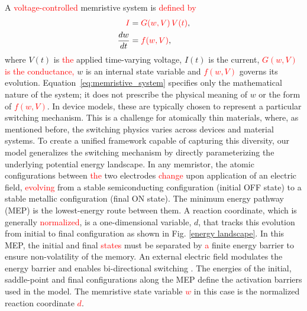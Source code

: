 \documentclass[aip,apl,reprint,floatfix]{revtex4-2}
\newcommand{\changed}[1]{\textcolor{red}{#1}}
\begin{document}

A \changed{voltage-controlled} memristive system \cite{Chua1976} is \changed{defined by}
\begin{equation}
\begin{aligned}
    \changed{I} &= \changed{G(w,V)\,V(t)}, \\
    \frac{dw}{dt} &= \changed{f(w,V)},
\end{aligned}
\label{eq:memristive_system}
\end{equation}
where $V(t)$ is \changed{the} applied time-varying voltage, $I(t)$ is the current, \changed{$G(w,V)$ is the conductance,} $w$ is an internal state variable and \changed{$f(w,V)$} governs its evolution. Equation~\eqref{eq:memristive_system} specifies only the mathematical nature of the system; it does not prescribe the physical meaning of $w$ or the form of \changed{$f(w,V)$}. In device models, these are typically chosen to represent a particular switching mechanism. This is a challenge for atomically thin materials, where, as mentioned before, the switching physics varies across devices and material systems. To create a unified framework capable of capturing this diversity, our model generalizes the switching mechanism by directly parameterizing the underlying potential energy landscape. In any memristor, the atomic configurations between \changed{the} two electrodes \changed{change} upon application of an electric field, \changed{evolving} from a stable semiconducting configuration (initial OFF state) to a stable metallic configuration (final ON state). The minimum energy pathway (MEP) is the lowest-energy route between them. A reaction coordinate, which is generally \changed{normalized}, is a one-dimensional variable, $d$, that tracks this evolution from initial to final configuration as shown in Fig. \ref{energy landscape}. In this MEP, the initial and final \changed{states} must be separated by \changed{a} finite energy barrier to ensure non-volatility of the memory. An external electric field modulates the energy barrier and enables bi-directional switching \cite{Ducry2022,Mitra2021,Guha}. The energies of the initial, saddle-point and final configurations along the MEP define the activation barriers used in the model. The memristive state variable \changed{$w$} in this case is the normalized reaction coordinate \changed{ $d$}.
\end{document}
